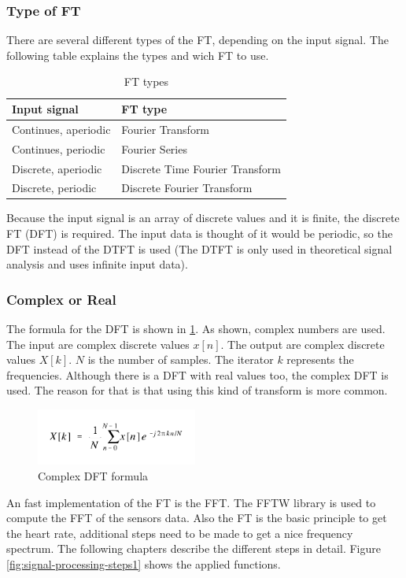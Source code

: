 \documentclass[notitlepage]{scrreprt}
\begin{document}
\subsubsection{Type of FT}
There are several different types of the FT, depending on the input signal. The following table explains the types and wich FT to use.

\begin{table}
\begin{tabular}{|l|l|}
	\hline
	Input signal & FT type \\ \hline
	Continues, aperiodic & Fourier Transform \\ \hline
	Continues, periodic & Fourier Series \\ \hline
	Discrete, aperiodic & Discrete Time Fourier Transform \\ \hline
	Discrete, periodic & Discrete Fourier Transform \\ \hline
\end{tabular}
\caption{FT types}
\end{table}

Because the input signal is an array of discrete values and it is finite, the discrete FT (DFT) is required. The input data is thought of it would be periodic, so the DFT instead of the DTFT is used (The DTFT is only used in theoretical signal analysis and uses infinite input data).

\subsubsection{Complex or Real}
The formula for the DFT is shown in \ref{fig:dft-formula}. As shown, complex numbers are used. The input are complex discrete values $x[n]$. The output are complex discrete values $X[k]$. $N$ is the number of samples. The iterator $k$ represents the frequencies. Although there is a DFT with real values too, the complex DFT is used. The reason for that is that using this kind of transform is more common.

\begin{figure}[H]
	\centering
	\includegraphics[width=200px]{images/complex_dft_formula.png}
	\caption{Complex DFT formula}
	\label{fig:dft-formula}
\end{figure}

An fast implementation of the FT is the FFT. The FFTW library is used to compute the FFT of the sensors data. Also the FT is the basic principle to get the heart rate, additional steps need to be made to get a nice frequency spectrum. The following chapters describe the different steps in detail. Figure \ref{fig:signal-processing-steps1} shows the applied functions.
\end{document}
